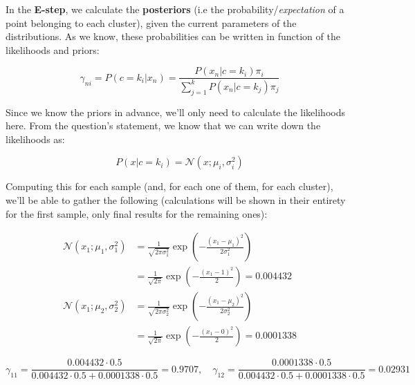 \documentclass[12pt]{article}
\begin{document}
\begin{enumerate}[leftmargin=\labelsep]
  In the \textbf{E-step}, we calculate the \textbf{posteriors} (i.e the probability/\textit{expectation}
  of a point belonging to each cluster), given the current parameters of the
  distributions. As we know, these probabilities can be written in function of the
  likelihoods and priors:

  \begin{equation*}
    \gamma_{ni} = P(c = k_i | x_n) = \frac{P(x_n | c = k_i) \pi_i}{\sum_{j = 1}^k P(x_n | c = k_j) \pi_j}
  \end{equation*}

  Since we know the priors in advance, we'll only need to calculate the likelihoods here.
  From the question's statement, we know that we can write down the likelihoods as:

  \begin{equation*}
    P(x | c = k_i) = \mathcal{N}(x; \mu_i, \sigma_i^2)
  \end{equation*}

  Computing this for each sample (and, for each one of them, for each cluster), we'll
  be able to gather the following (calculations will be shown in their entirety for the
  first sample, only final results for the remaining ones):

  \begin{equation*}
    \begin{aligned}
      \mathcal{N} (x_1; \mu_1, \sigma_1^2) & = \frac{1}{\sqrt{2 \pi \sigma_1^2}} \exp \left( - \frac{(x_1 - \mu_1)^2}{2 \sigma_1^2} \right) \\
                                           & = \frac{1}{\sqrt{2 \pi}} \exp \left( - \frac{(x_1 - 1)^2}{2} \right) = 0.004432                \\
      \mathcal{N} (x_1; \mu_2, \sigma_2^2) & = \frac{1}{\sqrt{2 \pi \sigma_2^2}} \exp \left( - \frac{(x_1 - \mu_2)^2}{2 \sigma_2^2} \right) \\
                                           & = \frac{1}{\sqrt{2 \pi}} \exp \left( - \frac{(x_1 - 0)^2}{2} \right) = 0.0001338
    \end{aligned}
  \end{equation*}

  \begin{equation*}
    \gamma_{11} = \frac{0.004432 \cdot 0.5}{0.004432 \cdot 0.5 + 0.0001338 \cdot 0.5} = 0.9707, \quad
    \gamma_{12} = \frac{0.0001338 \cdot 0.5}{0.004432 \cdot 0.5 + 0.0001338 \cdot 0.5} = 0.02931
  \end{equation*}


\end{enumerate}
\end{document}
